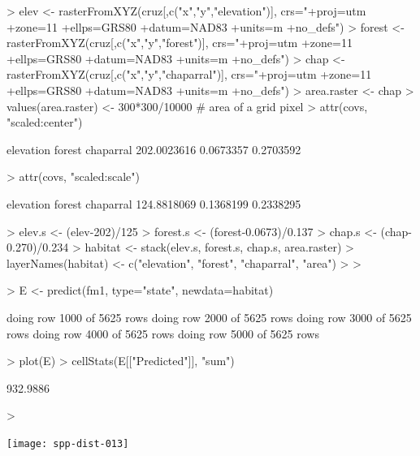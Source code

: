 \documentclass[a4paper]{article}
\renewenvironment{Schunk}{\vspace{\topsep}}{\vspace{\topsep}}
\begin{document}
\begin{Schunk}
\begin{Sinput}
> elev <- rasterFromXYZ(cruz[,c("x","y","elevation")],
      crs="+proj=utm +zone=11 +ellps=GRS80 +datum=NAD83 +units=m +no_defs")
> forest <- rasterFromXYZ(cruz[,c("x","y","forest")],
      crs="+proj=utm +zone=11 +ellps=GRS80 +datum=NAD83 +units=m +no_defs")
> chap <- rasterFromXYZ(cruz[,c("x","y","chaparral")],
      crs="+proj=utm +zone=11 +ellps=GRS80 +datum=NAD83 +units=m +no_defs")
> area.raster <- chap
> values(area.raster) <- 300*300/10000 # area of a grid pixel
> attr(covs, "scaled:center")
\end{Sinput}
\begin{Soutput}
  elevation      forest   chaparral 
202.0023616   0.0673357   0.2703592 
\end{Soutput}
\begin{Sinput}
> attr(covs, "scaled:scale")
\end{Sinput}
\begin{Soutput}
  elevation      forest   chaparral 
124.8818069   0.1368199   0.2338295 
\end{Soutput}
\begin{Sinput}
> elev.s <- (elev-202)/125
> forest.s <- (forest-0.0673)/0.137
> chap.s <- (chap-0.270)/0.234
> habitat <- stack(elev.s, forest.s, chap.s, area.raster)
> layerNames(habitat) <- c("elevation", "forest", "chaparral", "area")
> 
> 
\end{Sinput}
\end{Schunk}




\begin{Schunk}
\begin{Sinput}
> E <- predict(fm1, type="state", newdata=habitat)
\end{Sinput}
\begin{Soutput}
  doing row 1000 of 5625 rows
  doing row 2000 of 5625 rows
  doing row 3000 of 5625 rows
  doing row 4000 of 5625 rows
  doing row 5000 of 5625 rows
\end{Soutput}
\begin{Sinput}
> plot(E)
> cellStats(E[["Predicted"]], "sum")
\end{Sinput}
\begin{Soutput}
[1] 932.9886
\end{Soutput}
\begin{Sinput}
> 
\end{Sinput}
\end{Schunk}
\texttt{[image: spp-dist-013]}









\newpage


\end{document}
